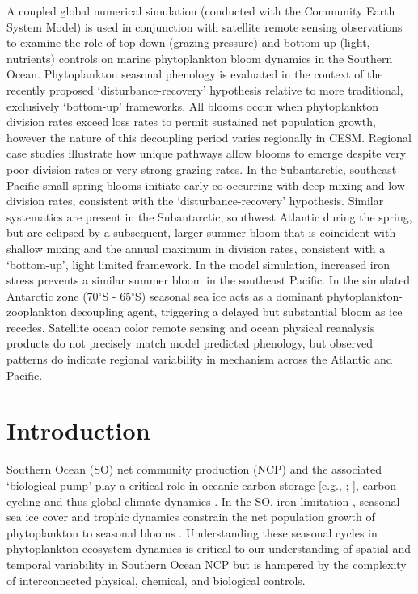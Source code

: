 A coupled global numerical simulation (conducted with the Community Earth System Model) is used in conjunction with satellite remote sensing observations to examine the role of top-down (grazing pressure) and bottom-up (light, nutrients) controls on marine phytoplankton bloom dynamics in the Southern Ocean. Phytoplankton seasonal phenology is evaluated in the context of the recently proposed `disturbance-recovery' hypothesis relative to more traditional, exclusively `bottom-up' frameworks. All blooms occur when phytoplankton division rates exceed loss rates to permit sustained net population growth, however the nature of this decoupling period varies regionally in CESM. Regional case studies illustrate how unique pathways allow blooms to emerge despite very poor division rates or very strong grazing rates.  In the Subantarctic, southeast Pacific small spring blooms initiate early co-occurring with deep mixing and low division rates, consistent with the `disturbance-recovery' hypothesis. Similar systematics are present in the Subantarctic, southwest Atlantic during the spring, but are eclipsed by a subsequent, larger summer bloom that is coincident with shallow mixing and the annual maximum in division rates, consistent with a `bottom-up', light limited framework. In the model simulation, increased iron stress prevents a similar summer bloom in the southeast Pacific. In the simulated Antarctic zone (70$^{\circ}$S - 65$^{\circ}$S) seasonal sea ice acts as a dominant phytoplankton-zooplankton decoupling agent, triggering a delayed but substantial bloom as ice recedes. Satellite ocean color remote sensing and ocean physical reanalysis products do not precisely match model predicted phenology, but observed patterns do indicate regional variability in mechanism across the Atlantic and Pacific. 

\section{Introduction}

Southern Ocean (SO) net community production (NCP) and the associated `biological pump' play a critical role in oceanic carbon storage [e.g., \textcite{MarinovImpactoceaniccirculation2008}; \textcite{HauckSouthernOceanCO22015}], carbon cycling \parencite{SiegelGlobalassessmentocean2014} and thus global climate dynamics \parencite{ChisholmOceanographyStirringtimes2000,TreguerPrefaceClimaticchanges2002}. In the SO, iron limitation \parencite{MartinIrondeficiencylimits1990,BoydEnvironmentalFactorsControlling2002}, seasonal sea ice cover \parencite{ArrigoSeculartrendsArctic2011} and trophic dynamics constrain the net population growth of phytoplankton to seasonal blooms \parencite{LonghurstEcologicalGeographySea2006}. Understanding these seasonal cycles in phytoplankton ecosystem dynamics is critical to our understanding of spatial and temporal variability in Southern Ocean NCP but is hampered by the complexity of interconnected physical, chemical, and biological controls. 

